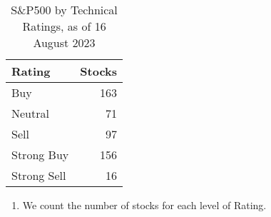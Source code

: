 \documentclass[
  letterpaper,
  DIV=11,
  numbers=noendperiod]{scrreport}
\newenvironment{Shaded}{\begin{snugshade}}{\end{snugshade}}
\newcommand{\AttributeTok}[1]{\textcolor[rgb]{0.40,0.45,0.13}{#1}}
\newcommand{\FunctionTok}[1]{\textcolor[rgb]{0.28,0.35,0.67}{#1}}
\newcommand{\NormalTok}[1]{\textcolor[rgb]{0.00,0.23,0.31}{#1}}
\newcommand{\OtherTok}[1]{\textcolor[rgb]{0.00,0.23,0.31}{#1}}
\newcommand{\SpecialCharTok}[1]{\textcolor[rgb]{0.37,0.37,0.37}{#1}}
\newcommand{\StringTok}[1]{\textcolor[rgb]{0.13,0.47,0.30}{#1}}
\providecommand{\tightlist}{%
  \setlength{\itemsep}{0pt}\setlength{\parskip}{0pt}}\usepackage{longtable,booktabs,array}
\begin{document}
\begin{table}

\caption{S&P500 by Technical Ratings, as of 16 August 2023}
\centering
\begin{tabular}[t]{l|r}
\hline
Rating & Stocks\\
\hline
Buy & 163\\
\hline
Neutral & 71\\
\hline
Sell & 97\\
\hline
Strong Buy & 156\\
\hline
Strong Sell & 16\\
\hline
\end{tabular}
\end{table}

\begin{enumerate}
\def\labelenumi{\arabic{enumi}.}
\setcounter{enumi}{3}
\tightlist
\item
  We count the number of stocks for each level of Rating.
\end{enumerate}

\begin{Shaded}
\end{Shaded}
\end{document}
